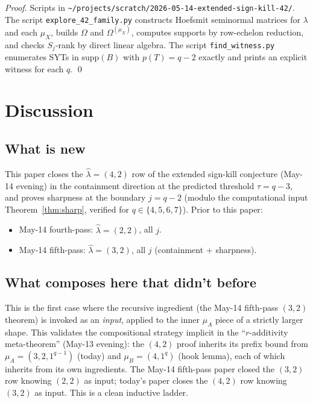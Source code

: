 \documentclass[11pt]{article}
\theoremstyle{definition}
\newcommand{\Om}{\Omega}
\newcommand{\hatl}{\widehat\lambda}
\newcommand{\supp}{\mathrm{supp}}
\begin{document}
\begin{proof}
Scripts in
\texttt{\textasciitilde/projects/scratch/2026-05-14-extended-sign-kill-42/}.
The script \texttt{explore\_42\_family.py} constructs Hoefsmit
seminormal matrices for $\lambda$ and each $\mu_X$, builds $\Om$
and $\Om^{(\mu_X)}$, computes supports by row-echelon reduction, and
checks $S_j$-rank by direct linear algebra.  The script
\texttt{find\_witness.py} enumerates SYTs in $\supp(B)$ with
$p(T) = q - 2$ exactly and prints an explicit witness for each $q$.
\qed
\end{proof}

\section{Discussion}\label{sec:discussion}

\subsection{What is new}

This paper closes the $\hatl = (4, 2)$ row of the extended sign-kill
conjecture (May-14 evening) in the containment direction at the
predicted threshold $\tau = q - 3$, and proves sharpness at the
boundary $j = q - 2$ (modulo the computational input
Theorem~\ref{thm:sharp}, verified for $q \in \{4, 5, 6, 7\}$).
Prior to this paper:
\begin{itemize}[topsep=0.3em,itemsep=0.1em]
\item May-14 fourth-pass: $\hatl = (2, 2)$, all $j$.
\item May-14 fifth-pass: $\hatl = (3, 2)$, all $j$ (containment + sharpness).
\end{itemize}

\subsection{What composes here that didn't before}

This is the first case where the recursive ingredient (the May-14
fifth-pass $(3, 2)$ theorem) is invoked as an \emph{input}, applied
to the inner $\mu_A$ piece of a strictly larger shape.  This
validates the compositional strategy implicit in the
``$r$-additivity meta-theorem'' (May-13 evening): the $(4, 2)$
proof inherits its prefix bound from $\mu_A = (3, 2, 1^{q-1})$
(today) and $\mu_B = (4, 1^q)$ (hook lemma), each of which inherits
from its own ingredients.  The May-14 fifth-pass paper closed the
$(3, 2)$ row knowing $(2, 2)$ as input; today's paper closes the
$(4, 2)$ row knowing $(3, 2)$ as input.  This is a clean inductive
ladder.
\end{document}
